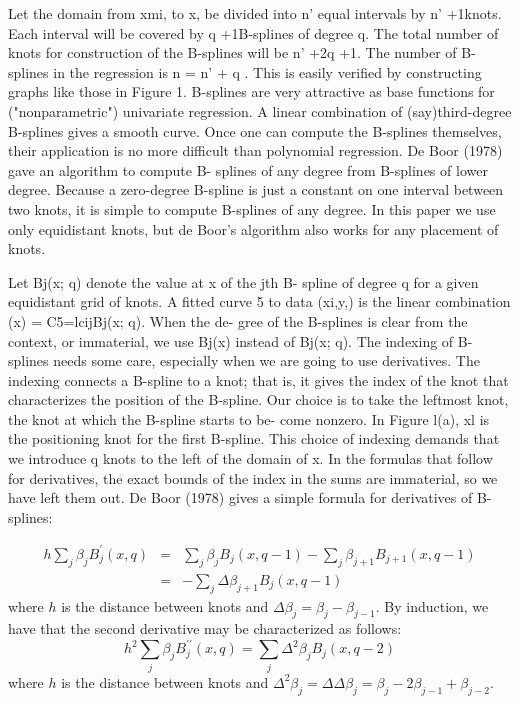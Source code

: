 \documentclass[12pt]{article}
\newcommand*\needsparaphrased{\color{red}}
\begin{document}
{Let the domain from xmi, to x, be divided into n' equal intervals by n' +1knots. Each interval will be covered by q +1B-splines of degree q. The total number of knots for construction of the B-splines will be n' +2q +1. The number of B-splines in the regression is n = n' + q . This is easily verified by constructing graphs like those in Figure 1.
B-splines are very attractive as base functions for ("nonparametric") univariate regression. A linear combination of (say)third-degree B-splines gives a smooth curve. Once one can compute the B-splines themselves, their application is no more difficult than polynomial regression.
De Boor (1978) gave an algorithm to compute B- splines of any degree from B-splines of lower degree. Because a zero-degree B-spline is just a constant on one interval between two knots, it is simple to compute B-splines of any degree. In this paper we use only equidistant knots, but de Boor's algorithm also works for any placement of knots.

Let Bj(x; q) denote the value at x of the jth B- spline of degree q for a given equidistant grid of knots. A fitted curve 5 to data (xi,y,) is the linear combination (x) = C5=lcijBj(x; q). When the de- gree of the B-splines is clear from the context, or immaterial, we use Bj(x) instead of Bj(x; q).
The indexing of B-splines needs some care, especially when we are going to use derivatives. The indexing connects a B-spline to a knot; that is, it gives the index of the knot that characterizes the position of the B-spline. Our choice is to take the leftmost knot, the knot at which the B-spline starts to be- come nonzero. In Figure l(a), xl is the positioning knot for the first B-spline. This choice of indexing demands that we introduce q knots to the left of the domain of x. In the formulas that follow for derivatives, the exact bounds of the index in the sums are immaterial, so we have left them out.
De Boor (1978) gives a simple formula for derivatives of B-splines:}
\begin{eqnarray}
h\sum_{j} \beta_j B_j^\prime \left(x,q\right) &=& \sum_{j} \beta_j B_j\left(x,q-1\right)-\sum_{j} \beta_{j+1} B_{j+1} \left(x,q-1\right) \nonumber \\ 
&=& -\sum_{j} \Delta\beta_{j+1} B_{j} \left(x,q-1\right) \label{bspline_deriv}
\end{eqnarray}
\noindent
where $h$ is the distance between knots and $\Delta \beta_j = \beta_j-\beta_{j-1}$. By induction, we have that the second derivative may be characterized as follows:
\begin{equation}
h^2\sum_{j} \beta_j B_j^{\prime \prime} \left(x,q\right) = \sum_{j} \Delta^2 \beta_{j} B_{j} \left(x,q-2\right) \label{bspline_2nd_deriv}
\end{equation}
\noindent
where $h$ is the distance between knots and $\Delta^2 \beta_j = \Delta\Delta \beta_j = \beta_j - 2\beta_{j-1}+\beta_{j-2} $. \needsparaphrased{This fact will prove very useful when we compare continuous and discrete roughness penalties in the next section.}
\end{document}
